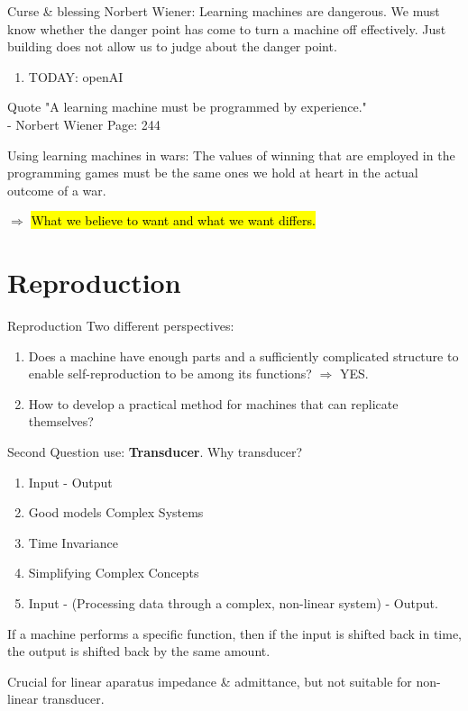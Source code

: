 \documentclass[xetex,notheorems,hyperref={pdfpagelabels=true},xcolor=table]{beamer}
\makeatletter
\let\HL\hl
\renewcommand\hl{%
  \let\set@color\beamerorig@set@color
  \let\reset@color\beamerorig@reset@color
  \HL}
\theoremstyle{plain}
\theoremstyle{definition}
\theoremstyle{example}
\theoremstyle{example}
\makeatother
\begin{document}
\begin{frame}{Curse \& blessing}
    Norbert Wiener: Learning machines are dangerous.
    We must know whether the danger point has come to turn a machine off effectively. Just building does not allow us to judge about the danger point.
    \begin{enumerate}
        \item TODAY: openAI
    \end{enumerate}
    \begin{block}{Quote}
        "A learning machine must be programmed by experience." \\ - Norbert Wiener Page: 244
    \end{block}
    Using learning machines in wars: The values of winning that are employed in the programming games must be the same ones we hold at heart in the actual outcome of a war.
    \vspace*{0.25cm}\newline
    \begin{center}
        $\Rightarrow$ \hl{What we believe to want and what we want differs.}  
    \end{center}
\end{frame}
\section{Reproduction}
\begin{frame}{Reproduction}
Two different perspectives:
\begin{enumerate}
    \item Does a machine have enough parts and a sufficiently complicated structure to enable self-reproduction to be among its functions? $\Rightarrow$ YES.
    \item How to develop a practical method for machines that can replicate themselves?
\end{enumerate}
Second Question use: \textbf{Transducer}. Why transducer? 
\begin{enumerate}
    \item Input - Output %
    \item Good models Complex Systems %
    \item Time Invariance
    \item Simplifying Complex Concepts
    \item Input - (Processing data through a complex, non-linear system) - Output.
\end{enumerate}
\begin{center}
If a machine performs a specific function, then if the input is shifted back in time, the output is shifted back by the same amount.
\end{center}
Crucial for linear aparatus impedance \& admittance, but not suitable for non-linear transducer.
\end{frame}
\end{document}

